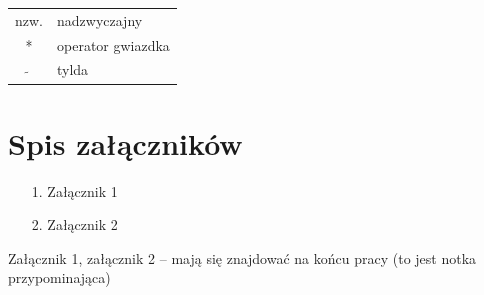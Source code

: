 \documentclass[pl]{minipw} %
\begin{document}
\begin{tabular}{cl}
nzw. & nadzwyczajny \\
* & operator gwiazdka \\
$\widetilde{}$ & tylda
\end{tabular}


\listoffigures


\renewcommand{\listtablename}{Spis tabel}
\listoftables


\chapter*{Spis załączników}
\begin{enumerate}
\item[1.] Załącznik 1
\item[2.] Załącznik 2
\end{enumerate}

\newpage
\pagestyle{empty}
Załącznik 1, załącznik 2 -- mają się znajdować na końcu pracy (to jest notka przypominająca)
\end{document}
